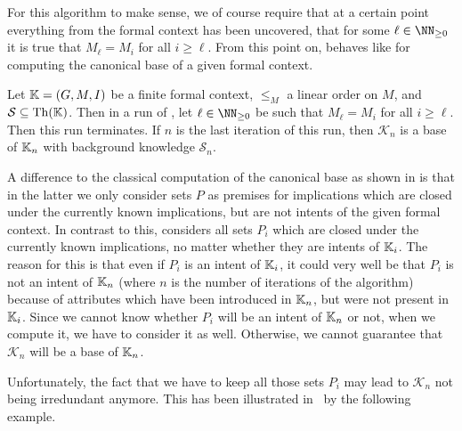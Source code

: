 For this algorithm to make sense, we of course require that at a certain point everything
from the formal context has been uncovered, \ie that for some $\ell \in \NN_{\geq 0}$ it
is true that $M_{\ell} = M_{i}$ for all $i \geq \ell$.  From this point on,
 behaves like  for
computing the canonical base of a given formal context.

\begin{Theorem}
  \label{thm:base-with-growing-set-of-attributes}
  Let ${\mathbb{K}} = (G, M, I)$ be a finite formal context, $\leq_{M}$ a linear order on $M$,
  and $\mathcal{S} \subseteq \operatorname{Th}({\mathbb{K}})$.  Then in a run of
  , let $\ell \in \NN_{\ge 0}$ be such that
  $M_{\ell} = M_{i}$ for all $i \geq \ell$.  Then this run terminates.  If $n$ is the last
  iteration of this run, then $\mathcal{K}_{n}$ is a base of ${\mathbb{K}}_{n}$ with background
  knowledge $\mathcal{S}_{n}$.
\end{Theorem}

A difference to the classical computation of the canonical base as shown in
 is that in the latter we only consider sets $P$ as premises for
implications which are closed under the currently known implications, but are not intents
of the given formal context.  In contrast to this,
 considers all sets $P_{i}$ which are closed
under the currently known implications, no matter whether they are intents of ${\mathbb{K}}_{i}$.  The reason for this is that even if $P_{i}$ is an intent of ${\mathbb{K}}_{i}$, it
could very well be that $P_{i}$ is not an intent of ${\mathbb{K}}_{n}$ (where $n$ is the number
of iterations of the algorithm) because of attributes which have been introduced in ${\mathbb{K}}_{n}$, but were not present in ${\mathbb{K}}_{i}$.  Since we cannot know whether $P_{i}$ will
be an intent of ${\mathbb{K}}_{n}$ or not, when we compute it, we have to consider it as well.
Otherwise, we cannot guarantee that $\mathcal{K}_{n}$ will be a base of ${\mathbb{K}}_{n}$.

Unfortunately, the fact that we have to keep all those sets $P_{i}$ may lead to
$\mathcal{K}_{n}$ not being irredundant anymore.  This has been illustrated
in~\cite{Diss-Felix} by the following example.


